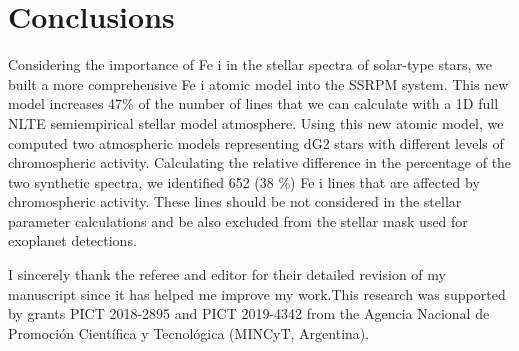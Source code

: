 \documentclass[baaa]{baaa}
\begin{document}
\section{Conclusions}
Considering the importance of Fe {\sc i} in the stellar spectra of solar-type stars, we built a more comprehensive Fe {\sc i} atomic model into the {\sc SSRPM} system. This new model increases 47\% of the number of lines that we can calculate with a 1D full NLTE semiempirical stellar model atmosphere. Using this new atomic model, we computed two atmospheric models representing dG2 stars with different levels of chromospheric activity. Calculating the relative difference in the percentage of the two synthetic spectra, we identified 652 (38 \%) Fe {\sc i} lines that are affected by chromospheric activity. These lines should be not considered in the stellar parameter calculations and be also excluded from the stellar mask used for exoplanet detections. 


\begin{acknowledgement}
 I sincerely thank the referee and editor for their detailed revision of my manuscript since it has helped me improve my work.This research was supported by grants PICT 2018-2895 and PICT 2019-4342 from the Agencia Nacional de Promoción Científica y Tecnológica (MINCyT, Argentina).
\end{acknowledgement}



\small

 
\end{document}
